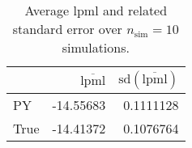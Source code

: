\begin{table}[H]

\caption{Average lpml and related standard error over $n_{\text{sim}} = 10$ simulations.}
\centering
\begin{tabular}[t]{lrr}
\toprule
  & $\overbar{\text{lpml}}$ & $\text{sd}(\overbar{\text{lpml}})$\\
\midrule
PY & -14.55683 & 0.1111128\\
True & -14.41372 & 0.1076764\\
\bottomrule
\end{tabular}
\end{table}